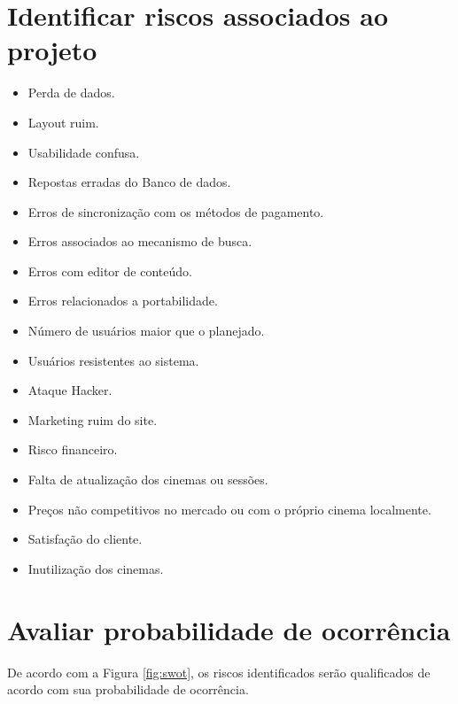 \documentclass[12pt]{article}
\begin{document}
    \section{Identificar riscos associados ao projeto}
        \begin{itemize}
            \item Perda de dados.
            \item Layout ruim.
            \item Usabilidade confusa.
            \item Repostas erradas do Banco de dados.
            \item Erros de sincronização com os métodos de pagamento.
            \item Erros associados ao mecanismo de busca.
            \item Erros com editor de conteúdo.
            \item Erros relacionados a portabilidade.
            \item Número de usuários maior que o planejado.
            \item Usuários resistentes ao sistema.
            \item Ataque Hacker.
            \item Marketing ruim do site.
            \item Risco financeiro.
            \item Falta de atualização dos cinemas ou sessões.
            \item Preços não competitivos no mercado ou com o próprio cinema localmente.
            \item Satisfação do cliente. 
            \item Inutilização dos cinemas.
        \end{itemize} 
        
    \section{Avaliar probabilidade de ocorrência}
        De acordo com a Figura \ref{fig:swot}, os riscos identificados serão qualificados de acordo com sua probabilidade de ocorrência.
        
\end{document}
